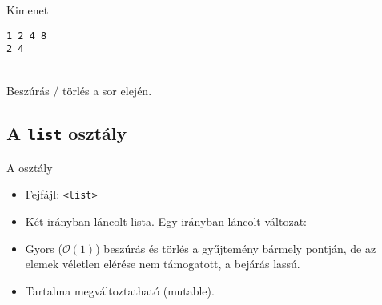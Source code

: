 \begin{frame}
    \begin{exampleblock}{}
        
    \end{exampleblock}
\end{frame}

\begin{frame}
    \begin{exampleblock}{}
        \small
        
    \end{exampleblock}
\end{frame}

\begin{frame}[fragile]
    \begin{block}{Kimenet}
        \vspace{-.4cm}
        \begin{verbatim}
1 2 4 8 
2 4
\end{verbatim}
        \vspace{-.3cm}
    \end{block}
    \vfill
    \begin{description}[m]
        \item[\hiv{\href{https://en.cppreference.com/w/cpp/container/deque/push_front}{\texttt{push\_front()}}}, \hiv{\href{https://en.cppreference.com/w/cpp/container/deque/pop_front}{\texttt{pop\_front()}}}] \hfill \\ Beszúrás / törlés a sor elején.
    \end{description}
\end{frame}

\subsection{A \texttt{list} osztály}

\begin{frame}
    A  osztály
    \begin{itemize}
        \item Fejfájl: \texttt{<list>}
        \item Két irányban láncolt lista. Egy irányban láncolt változat: 
        \item Gyors ($\mathcal{O}(1)$) beszúrás és törlés a gyűjtemény bármely pontján, de az elemek véletlen elérése nem támogatott, a bejárás lassú.
        \item Tartalma megváltoztatható (mutable).
    \end{itemize}
\end{frame}

